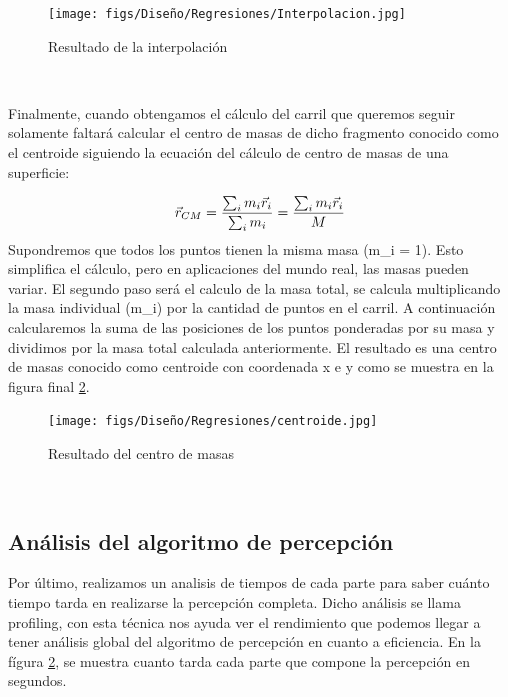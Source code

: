   \begin{figure} [H]
    \begin{center}
      \texttt{[image: figs/Diseño/Regresiones/Interpolacion.jpg]}
    \end{center}
    \caption{Resultado de la interpolación}
    \label{fig:interpolación}
  \end{figure}\

  Finalmente, cuando obtengamos el cálculo del carril que queremos seguir solamente faltará calcular el centro de masas de dicho fragmento conocido como el centroide siguiendo la ecuación
  del cálculo de centro de masas de una superficie: \newline
  

  \begin{equation} 
    \vec{r}_{CM} = \frac{\sum_{i}m_{i} \vec{r}_{i}}{\sum_{i}m_{i}} = \frac{\sum_{i}m_{i} \vec{r}_{i}}{M} 
    \newline
  \end{equation} 
  \newline
  Supondremos que todos los puntos tienen la misma masa (m\_i = 1). Esto simplifica el cálculo, pero en aplicaciones del mundo real, las masas pueden variar.
  El segundo paso será el calculo de la masa total, se calcula multiplicando la masa individual (m\_i) por la cantidad de puntos en el carril. A continuación calcularemos
  la suma de las posiciones de los puntos ponderadas por su masa y dividimos por la masa total calculada anteriormente. El resultado es una centro de masas conocido como centroide
  con coordenada x e y como se muestra en la figura final \ref{fig:centro de masas}. 

  \begin{figure} [H]
    \begin{center}
      \texttt{[image: figs/Diseño/Regresiones/centroide.jpg]}
    \end{center}
    \caption{Resultado del centro de masas}
    \label{fig:centro de masas}
  \end{figure}\

  \subsection{Análisis del algoritmo de percepción}
  \label{sec:Análisis del algoritmo de percepción}
  Por último, realizamos un analisis de tiempos de cada parte para saber cuánto tiempo tarda en realizarse la percepción completa. Dicho análisis se llama profiling, con esta técnica 
  nos ayuda ver el rendimiento que podemos llegar a tener análisis global del algoritmo de percepción en cuanto a eficiencia. En la fígura \ref{fig:centro de masas}, 
  se muestra cuanto tarda cada parte que compone la percepción en segundos.


